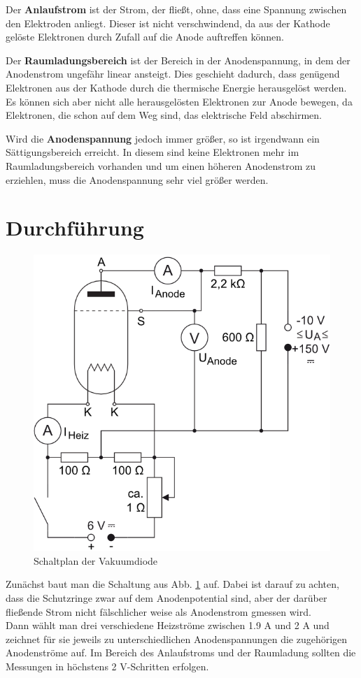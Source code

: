\documentclass[12pt,a4paper,titlepage,headinclude,bibtotoc]{scrartcl}
\begin{document}
Der \textbf{Anlaufstrom} ist der Strom, der fließt, ohne, dass eine Spannung zwischen den Elektroden anliegt.
Dieser ist nicht verschwindend, da aus der Kathode gelöste Elektronen durch Zufall auf die Anode auftreffen können.

Der \textbf{Raumladungsbereich} ist der Bereich in der Anodenspannung, in dem der Anodenstrom ungefähr linear ansteigt.
Dies geschieht dadurch, dass genügend Elektronen aus der Kathode durch die thermische Energie herausgelöst werden.
Es können sich aber nicht alle herausgelösten Elektronen zur Anode bewegen, da Elektronen, die schon auf dem Weg sind, das elektrische Feld abschirmen.

Wird die \textbf{Anodenspannung} jedoch immer größer, so ist irgendwann ein Sättigungsbereich erreicht.
In diesem sind keine Elektronen mehr im Raumladungsbereich vorhanden und um einen höheren Anodenstrom zu erziehlen, muss die Anodenspannung sehr viel größer werden.



\section{Durchführung}
\label{sec:durchfuehrung}
\begin{figure}[!h]
\centering
\includegraphics[width=0.5\linewidth]{aufbau}
\caption{Schaltplan der Vakuumdiode}
\label{fig:aufbau}
\end{figure}
Zunächst baut man die Schaltung aus Abb. \ref{fig:aufbau} auf.
Dabei ist darauf zu achten, dass die Schutzringe zwar auf dem Anodenpotential sind, aber der darüber fließende Strom nicht fälschlicher weise als Anodenstrom gmessen wird.\\
Dann wählt man drei verschiedene Heizströme zwischen 1.9 A und 2 A und zeichnet für sie jeweils zu unterschiedlichen Anodenspannungen die zugehörigen Anodenströme auf.
Im Bereich des Anlaufstroms und der Raumladung sollten die Messungen in höchstens 2 V-Schritten erfolgen.
\end{document}
